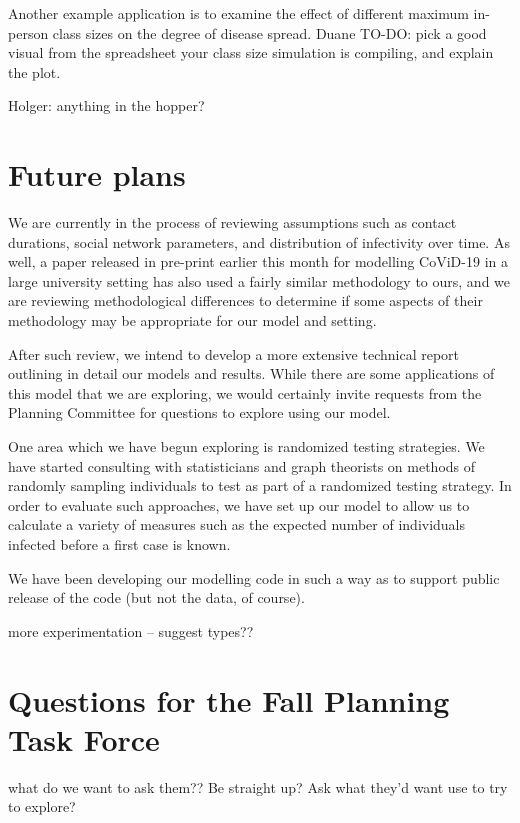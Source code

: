 \documentclass[fleqn,10pt]{SelfArx} %
\newcommand{\ed}[1]{{\color{blue} #1}}
\begin{document}
Another example application is to examine the effect of different maximum in-person class sizes on the degree of disease spread.  \ed{Duane TO-DO:  pick a good visual from the spreadsheet your class size simulation is compiling, and explain the plot.}

\ed{Holger:  anything in the hopper?}

\section{Future plans}

We are currently in the process of reviewing assumptions such as contact durations, social network parameters, and distribution of infectivity over time.  As well, a paper released in pre-print earlier this month for modelling CoViD-19 in a large university setting has also used a fairly similar methodology to ours, and we are reviewing methodological differences to determine if some aspects of their methodology may be appropriate for our model and setting.

After such review, we intend to develop a more extensive technical report outlining in detail our models and results.  While there are some applications of this model that we are exploring, we would certainly invite requests from the Planning Committee for questions to explore using our model. 

One area which we have begun exploring is randomized testing strategies.  We have started consulting with statisticians and graph theorists on methods of randomly sampling individuals to test as part of a randomized testing strategy.  In order to evaluate such approaches, we have set up our model to allow us to calculate a variety of measures such as the expected number of individuals infected before a first case is known.

We have been developing our modelling code in such a way as to support public release of the code (but not the data, of course).

\ed{more experimentation -- suggest types??}

\section{Questions for the Fall Planning Task Force}

\ed{what do we want to ask them??  Be straight up?  Ask what they'd want use to try to explore?}

\end{document}
